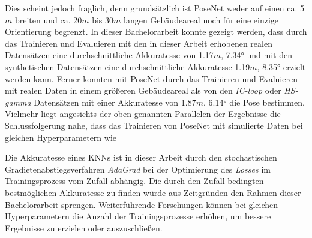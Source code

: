 







Dies scheint jedoch fraglich, denn grundsätzlich ist PoseNet weder auf einen ca. 5$m$ breiten und ca. 20$m$ bis 30$m$ langen Gebäudeareal noch für eine einzige Orientierung begrenzt. In dieser Bachelorarbeit konnte gezeigt werden, dass durch das Trainieren und Evaluieren mit den in dieser Arbeit erhobenen realen Datensätzen eine durchschnittliche Akkuratesse von 1.17$m$, 7.34° und mit den synthetischen Datensätzen eine durchschnittliche Akkuratesse 1.19$m$, 8.35° erzielt werden kann. Ferner konnten \citet{walchImageBasedLocalizationUsing2017} mit PoseNet durch das Trainieren und Evaluieren mit realen Daten in einem größeren Gebäudeareal als von den \textit{IC-loop} oder \textit{HS-gamma} Datensätzen mit einer Akkuratesse von 1.87$m$, 6.14° die Pose bestimmen. Vielmehr liegt angesichts der oben genannten Parallelen der Ergebnisse die Schlussfolgerung nahe, dass das Trainieren von PoseNet mit simulierte Daten bei gleichen Hyperparametern wie  \citet{acharyaBIMPoseNetIndoorCamera2019} 





 








Die Akkuratesse eines KNNs ist in dieser Arbeit durch den stochastischen Gradietenabstiegsverfahren \textit{AdaGrad} bei der Optimierung des \textit{Losses} im Trainingsprozess vom Zufall abhängig. Die durch den Zufall bedingten bestmöglichen Akkuratesse zu finden würde aus Zeitgründen den Rahmen dieser Bachelorarbeit sprengen. Weiterführende Forschungen können bei gleichen Hyperparametern die Anzahl der Trainingsprozesse erhöhen, um bessere Ergebnisse zu erzielen oder auszuschließen.


